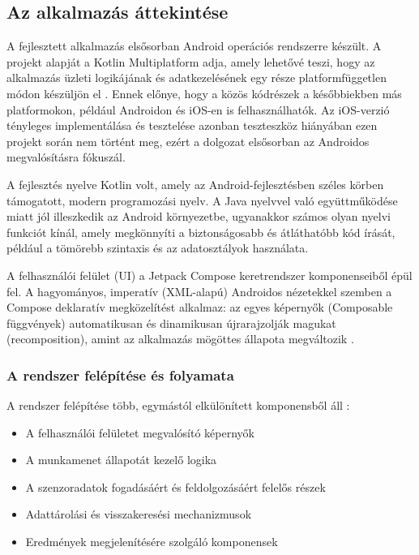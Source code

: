 \subsection{Az alkalmazás áttekintése}

A fejlesztett alkalmazás elsősorban Android operációs rendszerre készült. 
A projekt alapját a Kotlin Multiplatform adja, amely lehetővé teszi, hogy az alkalmazás üzleti 
logikájának és adatkezelésének egy része platformfüggetlen módon készüljön el \cite{kotlinmultiplatform}.
Ennek előnye, hogy a közös kódrészek a későbbiekben más platformokon, például Androidon és iOS-en is
felhasználhatók. Az iOS-verzió tényleges implementálása és tesztelése azonban teszteszköz hiányában
ezen projekt során nem történt meg, ezért a dolgozat elsősorban az Androidos megvalósításra fókuszál.

A fejlesztés nyelve Kotlin volt, amely az Android-fejlesztésben széles körben támogatott, modern 
programozási nyelv. A Java nyelvvel való együttműködése miatt jól illeszkedik az Android környezetbe,
ugyanakkor számos olyan nyelvi funkciót kínál, amely megkönnyíti a biztonságosabb és átláthatóbb kód 
írását, például a tömörebb szintaxis és az adatosztályok használata. \cite{kotlinandroid}

A felhasználói felület (UI) a Jetpack Compose keretrendszer komponenseiből épül fel. A hagyományos,
imperatív (XML-alapú) Androidos nézetekkel szemben a Compose deklaratív megközelítést alkalmaz: az egyes
képernyők (Composable függvények) automatikusan és dinamikusan újrarajzolják magukat (recomposition),
amint az alkalmazás mögöttes állapota megváltozik \cite{compose}.


\subsubsection{A rendszer felépítése és folyamata}

A rendszer felépítése több, egymástól elkülönített komponensből áll :
\begin{itemize}
    \item A felhasználói felületet megvalósító képernyők 
    \item A munkamenet állapotát kezelő logika 
    \item A szenzoradatok fogadásáért és feldolgozásáért felelős részek 
    \item Adattárolási és visszakeresési mechanizmusok 
    \item Eredmények megjelenítésére szolgáló komponensek 
\end{itemize}

